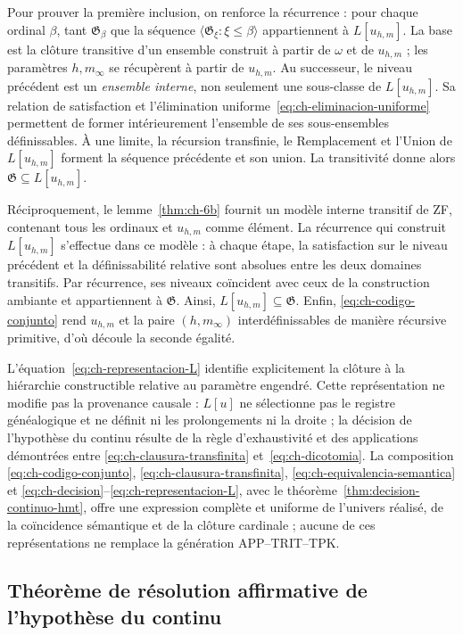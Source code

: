 Pour prouver la première inclusion, on renforce la récurrence : pour chaque
ordinal \(\beta\), tant \(\mathfrak G_\beta\) que la séquence
\(\langle\mathfrak G_\xi:\xi\leq\beta\rangle\) appartiennent à
\(L[u_{h,m}]\). La base est la clôture transitive d’un ensemble construit
à partir de \(\omega\) et de \(u_{h,m}\) ; les paramètres \(h,m_\infty\) se récupèrent
à partir de \(u_{h,m}\). Au successeur, le niveau précédent est un \emph{ensemble
interne}, non seulement une sous-classe de \(L[u_{h,m}]\). Sa relation de satisfaction
et l’élimination uniforme~\eqref{eq:ch-eliminacion-uniforme} permettent de former intérieurement l’ensemble de
ses sous-ensembles définissables. À une limite, la récursion transfinie,
le Remplacement et l’Union de \(L[u_{h,m}]\) forment la séquence précédente et son union.
La transitivité donne alors \(\mathfrak G\subseteq L[u_{h,m}]\).

Réciproquement, le lemme~\ref{thm:ch-6b} fournit un modèle interne
transitif de ZF, contenant tous les ordinaux et \(u_{h,m}\) comme élément.
La récurrence qui construit \(L[u_{h,m}]\) s’effectue dans ce modèle : à chaque
étape, la satisfaction sur le niveau précédent et la définissabilité relative sont
absolues entre les deux domaines transitifs. Par récurrence, ses niveaux
coïncident avec ceux de la construction ambiante et appartiennent à
\(\mathfrak G\). Ainsi, \(L[u_{h,m}]\subseteq\mathfrak G\). Enfin,
\eqref{eq:ch-codigo-conjunto} rend \(u_{h,m}\) et la paire \((h,m_\infty)\)
interdéfinissables de manière récursive primitive, d’où découle la seconde
égalité.

L'équation~\eqref{eq:ch-representacion-L} identifie explicitement la clôture à la hiérarchie constructible relative au paramètre engendré. Cette représentation ne modifie pas la provenance causale : \(L[u]\) ne sélectionne pas le registre généalogique et ne définit ni les prolongements ni la droite ; la décision de l'hypothèse du continu résulte de la règle d'exhaustivité et des applications démontrées entre \eqref{eq:ch-clausura-transfinita} et~\eqref{eq:ch-dicotomia}. La composition \eqref{eq:ch-codigo-conjunto}, \eqref{eq:ch-clausura-transfinita}, \eqref{eq:ch-equivalencia-semantica} et \eqref{eq:ch-decision}--\eqref{eq:ch-representacion-L}, avec le théorème~\ref{thm:decision-continuo-hmt}, offre une expression complète et uniforme de l'univers réalisé, de la coïncidence sémantique et de la clôture cardinale ; aucune de ces représentations ne remplace la génération APP--TRIT--TPK.

\subsection{Théorème de résolution affirmative de l’hypothèse du continu}

